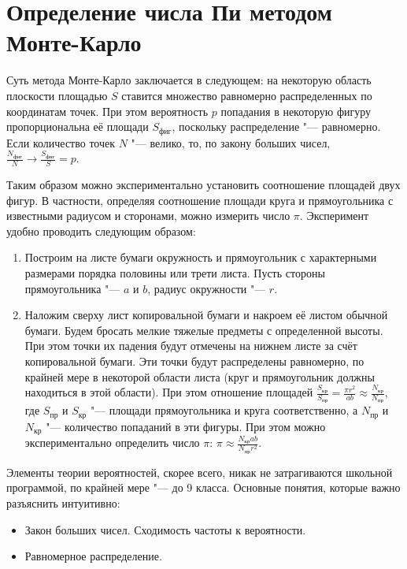\section{Определение числа Пи методом Монте-Карло}
\SolveVariant
Суть метода Монте-Карло заключается в следующем: на некоторую область плоскости площадью \(S\) ставится множество равномерно распределенных по координатам точек. При этом вероятность \(p\) попадания в некоторую фигуру пропорциональна её площади \(S_\text{фиг}\), поскольку распределение "--- равномерно. Если количество точек \(N\) "--- велико, то, по закону больших чисел, \(\frac{N_\text{фиг}}{N} \rightarrow \frac{S_\text{фиг}}{S}=p\).\par
Таким образом можно экспериментально установить соотношение площадей двух фигур. В частности, определяя соотношение площади круга и прямоугольника с известными радиусом и сторонами, можно измерить число \(\pi\).
Эксперимент удобно проводить следующим образом:
\begin{enumerate}
    \item Построим на листе бумаги окружность и прямоугольник с характерными размерами порядка половины или трети листа. Пусть стороны прямоугольника "--- \(a\) и \(b\), радиус окружности "--- \(r\).
    \item Наложим сверху лист копировальной бумаги и накроем её листом обычной бумаги. Будем бросать мелкие тяжелые предметы с определенной высоты. При этом точки их падения будут отмечены на нижнем листе за счёт копировальной бумаги. Эти точки будут распределены равномерно, по крайней мере в некоторой области листа (круг и прямоугольник должны находиться в этой области). При этом отношение площадей \(\frac{S_\text{кр}}{S_\text{пр}} = \frac{\pi r^2}{ab} \approx \frac{N_\text{кр}}{N_\text{пр}}\), где \(S_\text{пр}\) и \(S_\text{кр}\) "--- площади прямоугольника и круга соответственно, а \(N_\text{пр}\) и \(N_\text{кр}\) "--- количество попаданий в эти фигуры. При этом можно экспериментально определить число \(\pi\): \(\pi \approx \frac{N_\text{кр} a b}{N_\text{пр} r^2}\).
\end{enumerate}
\SchoolBase
Элементы теории вероятностей, скорее всего, никак не затрагиваются школьной программой, по крайней мере "--- до 9 класса. Основные понятия, которые важно разъяснить интуитивно:
\begin{itemize}
    \item Закон больших чисел. Сходимость частоты к вероятности.
    \item Равномерное распределение.
\end{itemize}
